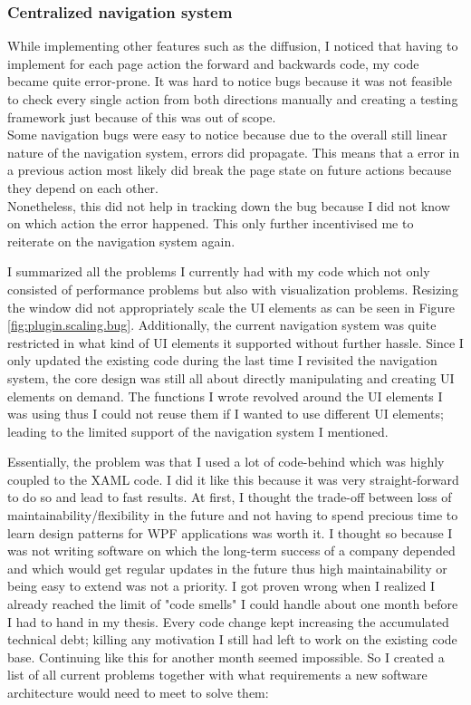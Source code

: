 \subsubsection{Centralized navigation system}

While implementing other features such as the diffusion, I noticed that having to implement for each page action the forward and backwards code, my code became quite error-prone. It was hard to notice bugs because it was not feasible to check every single action from both directions manually and creating a testing framework just because of this was out of scope. \\
Some navigation bugs were easy to notice because due to the overall still linear nature of the navigation system, errors did propagate. This means that a error in a previous action most likely did break the page state on future actions because they depend on each other. \\
Nonetheless, this did not help in tracking down the bug because I did not know on which action the error happened. This only further incentivised me to reiterate on the navigation system again.

I summarized all the problems I currently had with my code which not only consisted of performance problems but also with visualization problems. Resizing the window did not appropriately scale the UI elements as can be seen in Figure \ref{fig:plugin.scaling.bug}. Additionally, the current navigation system was quite restricted in what kind of UI elements it supported without further hassle. Since I only updated the existing code during the last time I revisited the navigation system, the core design was still all about directly manipulating and creating UI elements on demand. The functions I wrote revolved around the UI elements I was using thus I could not reuse them if I wanted to use different UI elements; leading to the limited support of the navigation system I mentioned.

Essentially, the problem was that I used a lot of code-behind which was highly coupled to the XAML code. I did it like this because it was very straight-forward to do so and lead to fast results. At first, I thought the trade-off between loss of maintainability/flexibility in the future and not having to spend precious time to learn design patterns for WPF applications was worth it. I thought so because I was not writing software on which the long-term success of a company depended and which would get regular updates in the future thus high maintainability or being easy to extend was not a priority. I got proven wrong when I realized I already reached the limit of "code smells" I could handle about one month before I had to hand in my thesis. Every code change kept increasing the accumulated technical debt; killing any motivation I still had left to work on the existing code base. Continuing like this for another month seemed impossible. So I created a list of all current problems together with what requirements a new software architecture would need to meet to solve them:

